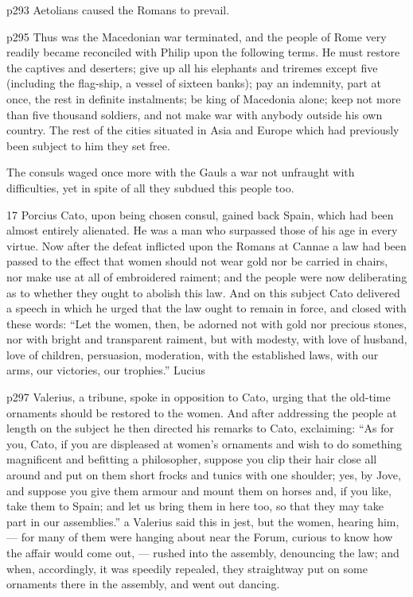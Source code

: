 p293 Aetolians caused the Romans to prevail.

p295
Thus was the Macedonian war terminated, and the people of Rome very readily became reconciled with Philip upon the following terms. He must restore the captives and deserters; give up all his elephants and triremes except five (including the flag-ship, a vessel of sixteen banks); pay an indemnity, part at once, the rest in definite instalments; be king of Macedonia alone; keep not more than five thousand soldiers, and not make war with anybody outside his own country. The rest of the cities situated in Asia and Europe which had previously been subject to him they set free.

The consuls waged once more with the Gauls a war not unfraught with difficulties, yet in spite of all they subdued this people too.

17
Porcius Cato, upon being chosen consul, gained back Spain, which had been almost entirely alienated. He was a man who surpassed those of his age in every virtue. Now after the defeat inflicted upon the Romans at Cannae a law had been passed to the effect that women should not wear gold nor be carried in chairs, nor make use at all of embroidered raiment; and the people were now deliberating as to whether they ought to abolish this law. And on this subject Cato delivered a speech in which he urged that the law ought to remain in force, and closed with these words: ``Let the women, then, be adorned not with gold nor precious stones, nor with bright and transparent raiment, but with modesty, with love of husband, love of children, persuasion, moderation, with the established laws, with our arms, our victories, our trophies.'' Lucius

p297 Valerius, a tribune, spoke in opposition to Cato, urging that the old-time ornaments should be restored to the women. And after addressing the people at length on the subject he then directed his remarks to Cato, exclaiming: ``As for you, Cato, if you are displeased at women's ornaments and wish to do something magnificent and befitting a philosopher, suppose you clip their hair close all around and put on them short frocks and tunics with one shoulder; yes, by Jove, and suppose you give them armour and mount them on horses and, if you like, take them to Spain; and let us bring them in here too, so that they may take part in our assemblies.''\texthebrew{⁠} a Valerius said this in jest, but the women, hearing him, \texthebrew{—} for many of them were hanging about near the Forum, curious to know how the affair would come out, \texthebrew{—} rushed into the assembly, denouncing the law; and when, accordingly, it was speedily repealed, they straightway put on some ornaments there in the assembly, and went out dancing.

